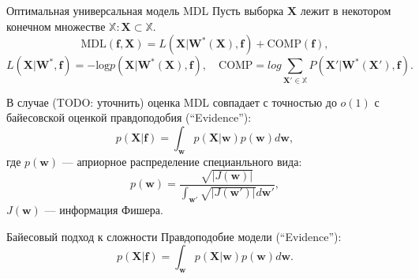 \documentclass[10pt,pdf,utf8,russian,aspectratio=169]{beamer}
\begin{document}
\begin{frame}{Оптимальная универсальная модель MDL}
Пусть выборка $\mathbf{X}$ лежит в некотором конечном множестве $\mathbb{X}: \mathbf{X} \subset \mathbb{X}$.
\[
\text{MDL}(\mathbf{f}, \mathbf{X}) = L(\mathbf{X}|\mathbf{W}^*(\mathbf{X}), \mathbf{f}) + \text{COMP}(\mathbf{f}),
\]
$$ L(\mathbf{X}|\mathbf{W}^*, \mathbf{f}) = -\text{log}p(\mathbf{X}|\mathbf{W}^*(\mathbf{X}), \mathbf{f}), \quad 
\text{COMP} = log \sum_{\mathbf{X}' \in \mathbb{X}} P(\mathbf{X}'|\mathbf{W}^*(\mathbf{X}'), \mathbf{f}).$$

В случае (TODO: уточнить) оценка MDL совпадает с точностью до $o(1)$ с байесовской оценкой правдоподобия (``Evidence''):
\[
	p(\mathbf{X}|\mathbf{f}) = \int_\mathbf{w} p(\mathbf{X}|\mathbf{w})p(\mathbf{w}) d\mathbf{w},
\]
где $p(\mathbf{w})$ --- априорное распределение специанльного вида:
$$
	p(\mathbf{w}) = \frac{\sqrt{|J(\mathbf{w})|}}{\int_{\mathbf{w}'} \sqrt{|J(\mathbf{w'})|}d\mathbf{w'}},
$$
$J(\mathbf{w})$  --- информация Фишера.
\end{frame}	


\begin{frame}{Байесовый подход к сложности}
Правдоподобие модели (``Evidence''):
\[
	p(\mathbf{X}|\mathbf{f}) = \int_\mathbf{w} p(\mathbf{X}|\mathbf{w})p(\mathbf{w}) d\mathbf{w}.
\]


\begin{figure}
  \centering
\label{fig:1}\qquad

\end{figure}


\end{frame}
\end{document}
